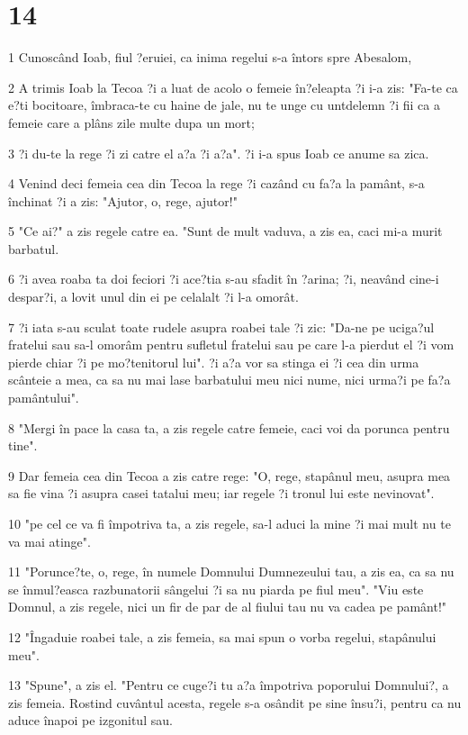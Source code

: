 \chapter{14}

\par 1 Cunoscând Ioab, fiul ?eruiei, ca inima regelui s-a întors spre Abesalom,
\par 2 A trimis Ioab la Tecoa ?i a luat de acolo o femeie în?eleapta ?i i-a zis: "Fa-te ca e?ti bocitoare, îmbraca-te cu haine de jale, nu te unge cu untdelemn ?i fii ca a femeie care a plâns zile multe dupa un mort;
\par 3 ?i du-te la rege ?i zi catre el a?a ?i a?a". ?i i-a spus Ioab ce anume sa zica.
\par 4 Venind deci femeia cea din Tecoa la rege ?i cazând cu fa?a la pamânt, s-a închinat ?i a zis: "Ajutor, o, rege, ajutor!"
\par 5 "Ce ai?" a zis regele catre ea. "Sunt de mult vaduva, a zis ea, caci mi-a murit barbatul.
\par 6 ?i avea roaba ta doi feciori ?i ace?tia s-au sfadit în ?arina; ?i, neavând cine-i despar?i, a lovit unul din ei pe celalalt ?i l-a omorât.
\par 7 ?i iata s-au sculat toate rudele asupra roabei tale ?i zic: "Da-ne pe uciga?ul fratelui sau sa-l omorâm pentru sufletul fratelui sau pe care l-a pierdut el ?i vom pierde chiar ?i pe mo?tenitorul lui". ?i a?a vor sa stinga ei ?i cea din urma scânteie a mea, ca sa nu mai lase barbatului meu nici nume, nici urma?i pe fa?a pamântului".
\par 8 "Mergi în pace la casa ta, a zis regele catre femeie, caci voi da porunca pentru tine".
\par 9 Dar femeia cea din Tecoa a zis catre rege: "O, rege, stapânul meu, asupra mea sa fie vina ?i asupra casei tatalui meu; iar regele ?i tronul lui este nevinovat".
\par 10 "pe cel ce va fi împotriva ta, a zis regele, sa-l aduci la mine ?i mai mult nu te va mai atinge".
\par 11 "Porunce?te, o, rege, în numele Domnului Dumnezeului tau, a zis ea, ca sa nu se înmul?easca razbunatorii sângelui ?i sa nu piarda pe fiul meu". "Viu este Domnul, a zis regele, nici un fir de par de al fiului tau nu va cadea pe pamânt!"
\par 12 "Îngaduie roabei tale, a zis femeia, sa mai spun o vorba regelui, stapânului meu".
\par 13 "Spune", a zis el. "Pentru ce cuge?i tu a?a împotriva poporului Domnului?, a zis femeia. Rostind cuvântul acesta, regele s-a osândit pe sine însu?i, pentru ca nu aduce înapoi pe izgonitul sau.
